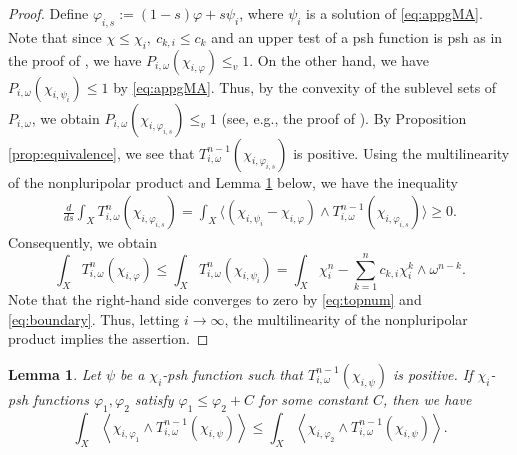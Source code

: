 \documentclass{amsart}
\numberwithin{equation}{section}
\theoremstyle{plain}
\newtheorem{lem}[equation]{Lemma}
\theoremstyle{definition}
\theoremstyle{remark}
\begin{document}
\begin{proof}
    Define $\varphi_{i,s}:=(1-s)\varphi+s\psi_i$, where $\psi_i$ is a solution of \eqref{eq:appgMA}. Note that since $\chi\le\chi_i, \ c_{k,i}\le c_k$ and an upper test of a psh function is psh as in the proof of \cite[Proposition 1.3]{EGZ}, we have $P_{i,\omega}(\chi_{i,\varphi})\le_v 1$. On the other hand, we have $P_{i,\omega}(\chi_{i,\psi_i})\le 1$ by \eqref{eq:appgMA}. Thus, by the convexity of the sublevel sets of $P_{i,\omega}$, we obtain $P_{i,\omega}(\chi_{i,\varphi_{i,s}})\le_v 1$ (see, e.g., the proof of \cite[Theorem 5.8]{CC}). By Proposition \ref{prop:equivalence}, we see that $T^{n-1}_{i,\omega}(\chi_{i,\varphi_{i,s}})$ is positive. Using the multilinearity of the nonpluripolar product and Lemma \ref{lem:ppineq} below, we have the inequality
    \begin{equation*}
        \begin{split}
            \frac{d}{ds}\int_X T^n_{i,\omega}(\chi_{i,\varphi_{i,s}})
            =\int_X \Big\langle(\chi_{i,\psi_i}-\chi_{i,\varphi})\wedge T^{n-1}_{i,\omega}(\chi_{i,\varphi_{i,s}})\Big\rangle\ge 0.
        \end{split}
    \end{equation*}
    Consequently, we obtain
    $$\int_X T^n_{i,\omega}(\chi_{i,\varphi})\le
    \int_X T^n_{i,\omega}(\chi_{i,\psi_i})=\int_X\chi_i^n-\sum_{k=1}^n c_{k,i}\chi_i^k\wedge\omega^{n-k}.$$
    Note that the right-hand side converges to zero by \eqref{eq:topnum} and \eqref{eq:boundary}. Thus, letting $i\to\infty$, the multilinearity of the nonpluripolar product implies the assertion.
\end{proof}


\begin{lem}\label{lem:ppineq}
    Let $\psi$ be a $\chi_i$-psh function such that $T^{n-1}_{i,\omega}(\chi_{i,\psi})$ is positive. If $\chi_i$-psh functions $\varphi_1,\varphi_2$ satisfy $\varphi_1\le\varphi_2+C$ for some constant $C$, then we have
    $$\int_X\left\langle\chi_{i,\varphi_1}\wedge T^{n-1}_{i,\omega}(\chi_{i,\psi})\right\rangle\le\int_X\left\langle\chi_{i,\varphi_2}\wedge T^{n-1}_{i,\omega}(\chi_{i,\psi})\right\rangle.$$
\end{lem}
\end{document}
